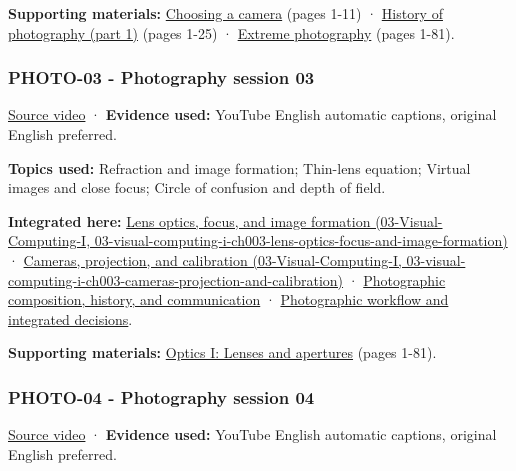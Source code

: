 \textbf{Supporting materials:} \href{https://drive.google.com/open?id=0B6w2XfPHEcZYQlF2U1VjRHRNLUE}{Choosing a camera} (pages 1-11) · \href{https://drive.google.com/open?id=0B6w2XfPHEcZYcm1nc0lRV0h4dzg}{History of photography (part 1)} (pages 1-25) · \href{https://drive.google.com/file/d/0B6w2XfPHEcZYVTZ5YzFzdXc3b0U/view?usp=sharing}{Extreme photography} (pages 1-81).

\subsubsection{PHOTO-03 - Photography session 03}\label{04-visual-computing-ii-ch036-photo-03---photography-session-03}

\href{https://www.youtube.com/watch?v=Q-hIFIHay9I}{Source video} · \textbf{Evidence used:} YouTube English automatic captions, original English preferred.

\textbf{Topics used:} Refraction and image formation; Thin-lens equation; Virtual images and close focus; Circle of confusion and depth of field.

\textbf{Integrated here:} \href{../03-Visual-Computing-I/main.pdf\#nameddest=03-visual-computing-i-ch003-lens-optics-focus-and-image-formation}{Lens optics, focus, and image formation (03-Visual-Computing-I, 03-visual-computing-i-ch003-lens-optics-focus-and-image-formation)} · \href{../03-Visual-Computing-I/main.pdf\#nameddest=03-visual-computing-i-ch003-cameras-projection-and-calibration}{Cameras, projection, and calibration (03-Visual-Computing-I, 03-visual-computing-i-ch003-cameras-projection-and-calibration)} · \hyperref[04-visual-computing-ii-ch034-photographic-composition-history-and-communication]{Photographic composition, history, and communication} · \hyperref[04-visual-computing-ii-ch034-photographic-workflow-and-integrated-decisions]{Photographic workflow and integrated decisions}.

\textbf{Supporting materials:} \href{https://drive.google.com/file/d/0B6w2XfPHEcZYT0dwaFF4emd6Vzg/view?usp=sharing}{Optics I: Lenses and apertures} (pages 1-81).

\subsubsection{PHOTO-04 - Photography session 04}\label{04-visual-computing-ii-ch036-photo-04---photography-session-04}

\href{https://www.youtube.com/watch?v=Y6kwPir0uMM}{Source video} · \textbf{Evidence used:} YouTube English automatic captions, original English preferred.

